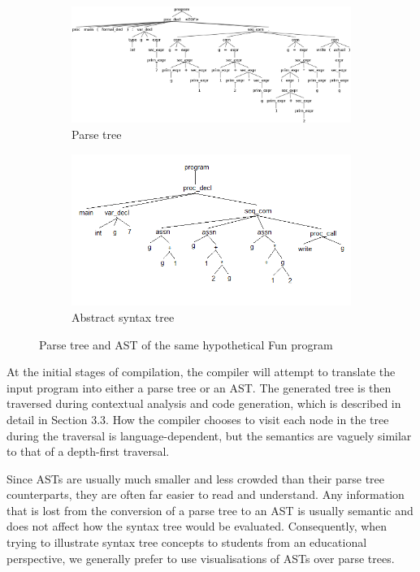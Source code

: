 \documentclass{l4proj}
\begin{document}
\begin{figure}[h]
	\centering
	\begin{subfigure}[b]{.5\textwidth}
		\centering
		\includegraphics[width=.95\linewidth]{images/2-2a.png}
		\caption{Parse tree}
		\label{fig:ANTLR-parse-tree}
	\end{subfigure}%
	\begin{subfigure}[b]{.5\textwidth}
	 	\centering
		\includegraphics[width=.95\linewidth]{images/2-2b.png}
		\caption{Abstract syntax tree}
		\label{fig:ANTLR-syntax-tree}
	\end{subfigure}
	\caption{Parse tree and AST of the same hypothetical Fun program}\label{fig:parse-abstract-tree}	
\end{figure}

At the initial stages of compilation, the compiler will attempt to translate the input program into either a parse tree or an AST. The generated tree is then traversed during contextual analysis and code generation, which is described in detail in Section 3.3. How the compiler chooses to visit each node in the tree during the traversal is language-dependent, but the semantics are vaguely similar to that of a depth-first traversal. 

Since ASTs are usually much smaller and less crowded than their parse tree counterparts, they are often far easier to read and understand. Any information that is lost from the conversion of a parse tree to an AST is usually semantic and does not affect how the syntax tree would be evaluated. Consequently, when trying to illustrate syntax tree concepts to students from an educational perspective, we generally prefer to use visualisations of ASTs over parse trees.
\end{document}
